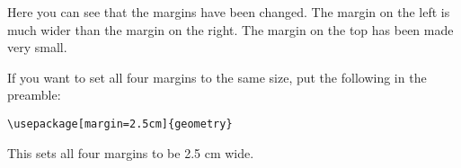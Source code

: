 \documentclass[a4paper,12pt]{article}
\begin{document}
Here you can see that the margins have been changed. The margin on the left is much wider than the margin on the right. The margin on the top has been made very small.

If you want to set all four margins to the same size, put the following in the preamble: %

\begin{verbatim}
\usepackage[margin=2.5cm]{geometry}
\end{verbatim}

This sets all four margins to be 2.5 cm wide.
\end{document}
